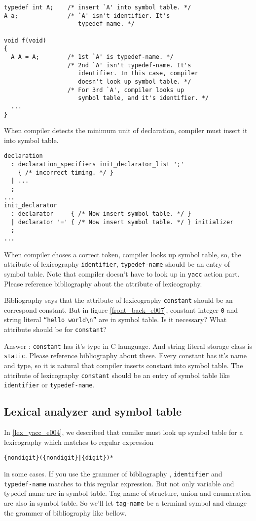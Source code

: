 \begin{verbatim}
typedef int A;    /* insert `A' into symbol table. */
A a;              /* `A' isn't identifier. It's 
                     typedef-name. */

void f(void)
{
  A A = A;        /* 1st `A' is typedef-name. */
                  /* 2nd `A' isn't typedef-name. It's
                     identifier. In this case, compiler
                     doesn't look up symbol table. */
                  /* For 3rd `A', compiler looks up 
                     symbol table, and it's identifier. */
  ...
}
\end{verbatim}
When compiler detects the minimum unit of declaration,
compiler must insert it into symbol table.

\begin{verbatim}
declaration
  : declaration_specifiers init_declarator_list ';'
    { /* incorrect timing. */ }
  | ...
  ;
...
init_declarator
  : declarator     { /* Now insert symbol table. */ }
  | declarator '=' { /* Now insert symbol table. */ } initializer
  ;
...
\end{verbatim}
When compiler choses a correct token, compiler looks up symbol
table, so, the attribute of lexicography {\tt{identifier}}, {\tt{typedef-name}}
should be an entry of symbol table.
Note that compiler doesn't have to look up in {\tt{yacc}} action part.
Please reference bibliography \cite{doragon} about the attribute
of lexicography.

\begin{QandA}
Bibliography \cite{doragon} says that
the attribute of lexicography {\tt{constant}}
should be an correspond constant. But in figure
\ref{front_back_e007}, constant integer {\tt{0}}
and string literal {\tt{``hello world\verb|\|n''}}
are in symbol table. Is it necessary? What attribute 
should be for {\tt{constant}}?

Answer : {\tt{constant}} has it's type in C launguage.
And string literal storage class is {\tt{static}}.
Please reference bibliography \cite{ISO} about these.
Every constant has it's name and type, so it is natural
that compiler inserts constant into symbol table.
The attribute of lexicography {\tt{constant}} 
should be an entry of symbol table like {\tt{identifier}}
or {\tt{typedef-name}}.
\end{QandA}

\subsection{Lexical analyzer and symbol table}
\label{lex_yacc007_e}
In \ref{lex_yacc_e004}, we described that comiler must
look up symbol table for a lexicography
which matches to regular expression
\begin{verbatim}
{nondigit}({nondigit}|{digit})*
\end{verbatim}
in some cases. If you use the grammer of bibliography \cite{ISO},
{\tt identifier} and {\tt typedef-name} matches to this regular
expression. But not only variable and typedef name are in symbol table.
Tag name of structure, union and enumeration are also in symbol table.
So we'll let {\tt tag-name} be a terminal symbol and change the
grammer of bibliography \cite{ISO} like bellow.

